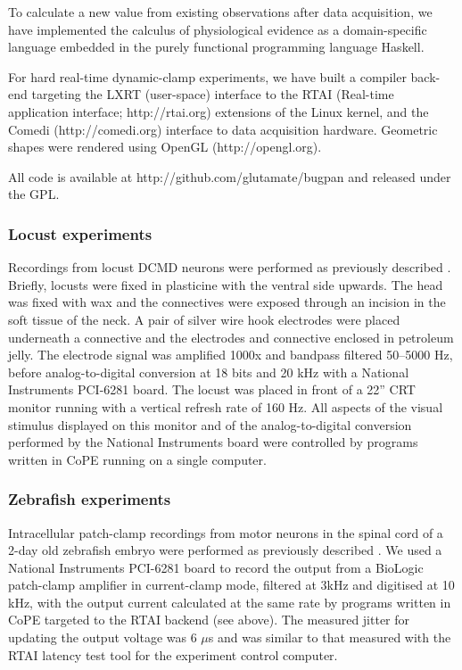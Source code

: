 To calculate a new value from existing observations after data
acquisition, we have implemented the calculus of physiological
evidence as a domain-specific language embedded in the purely functional
programming language Haskell.

For hard real-time dynamic-clamp experiments, we have built a compiler
back-end targeting the LXRT (user-space) interface to the RTAI (Real-time
application interface; http://rtai.org) extensions of the Linux
kernel, and the Comedi (http://comedi.org) interface to data
acquisition hardware. Geometric shapes were rendered using OpenGL
(http://opengl.org).

All code is available at http://github.com/glutamate/bugpan and
released under the GPL.

\subsubsection*{Locust experiments}

Recordings from locust DCMD neurons were performed as previously
described \citep{Matheson2004}. Briefly, locusts were fixed in
plasticine with the ventral side upwards. The head was fixed with wax
and the connectives were exposed through an
incision in the soft tissue of the neck. A pair of silver wire hook
electrodes were placed underneath a connective and the electrodes
and connective enclosed in petroleum jelly. The electrode signal was
amplified 1000x and bandpass filtered 50--5000 Hz, before
analog-to-digital conversion at 18 bits and 20 kHz with a National
Instruments PCI-6281 board. The locust was placed in front of a 22''
CRT monitor running with a vertical refresh rate of 160 Hz. All
aspects of the visual stimulus displayed on this monitor and of
the analog-to-digital conversion performed by the National Instruments
board were controlled by programs written in
CoPE running on a single computer.

\subsubsection*{Zebrafish experiments}

Intracellular patch-clamp recordings from motor neurons in the spinal
cord of a 2-day old zebrafish embryo were performed as previously
described \citep{McDearmid2006}. We used a National Instruments PCI-6281
board to
record the output from a BioLogic patch-clamp amplifier in
current-clamp mode, filtered at 3kHz and digitised at 10 kHz, with the
output current calculated at the same rate by programs written in
CoPE targeted to the RTAI backend (see
above). The measured jitter for updating the output voltage was 6
$\mu$s and was similar to that measured with the RTAI latency test
tool for the experiment control computer.

